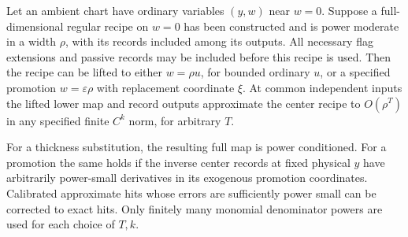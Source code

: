 \begin{lemma}
\label{lem:elimination-lift}
Let an ambient chart have ordinary variables $(y,w)$ near $w=0$.
Suppose a full-dimensional regular recipe on $w=0$ has been constructed
and is power moderate in a width $\rho$, with its records included
among its outputs.  All necessary flag extensions and passive records
may be included before this recipe is used.  Then the recipe can be
lifted to either $w=\rho u$, for bounded ordinary $u$, or a specified
promotion $w=\varepsilon\rho$ with replacement coordinate $\xi$.
At common independent inputs the lifted lower map and record outputs
approximate the center recipe to $O(\rho^T)$ in any specified finite
$C^k$ norm, for arbitrary $T$.

For a thickness substitution, the resulting full map is power
conditioned.  For a promotion the same holds if the inverse center
records at fixed physical $y$ have arbitrarily power-small derivatives
in its exogenous promotion coordinates.  Calibrated approximate hits
whose errors are sufficiently power small can be corrected to exact
hits.  Only finitely many monomial denominator powers are used for
each choice of $T,k$.
\end{lemma}

